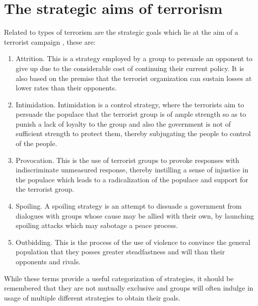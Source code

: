 \section{The strategic aims of terrorism}
Related to types of terrorism are the strategic goals which lie at the aim of a terrorist campaign \citep{kydd2006strategies}, these are:
\begin{enumerate}
\item Attrition. This is a strategy employed by a group to persuade an opponent to give up due to the considerable cost of continuing their current policy. It is also based on the premise that the terrorist organization can sustain losses at lower rates than their opponents.
\item Intimidation. Intimidation is a control strategy, where the terrorists aim to persuade the populace that the terrorist group is of ample strength so as to punish a lack of loyalty to the group and also the government is not of sufficient strength to protect them, thereby subjugating the people to control of the people.
\item Provocation. This is the use of terrorist groups to provoke responses with indiscriminate unmeasured response, thereby instilling a sense of injustice in the populace which leads to a radicalization of the populace and support for the terrorist group.
\item Spoiling. A spoiling strategy is an attempt to dissuade a government from dialogues with groups whose cause may be allied with their own, by launching spoiling attacks which may sabotage a peace process. 
\item Outbidding. This is the process of the use of violence to convince the general population that they posses  greater steadfastness and will than their opponents and rivals.
\end{enumerate}

While these terms provide a useful categorization of strategies, it should be remembered that they are not mutually exclusive and groups will often indulge in usage of multiple different strategies to obtain their goals.

